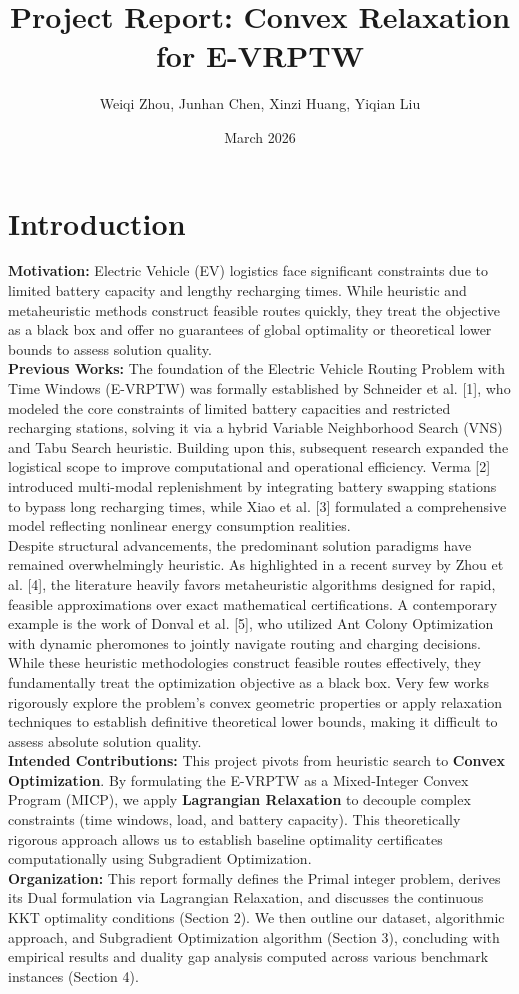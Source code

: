 \documentclass[11pt]{article}
\title{\textbf{Project Report: Convex Relaxation for E-VRPTW}}
\author{Weiqi Zhou, Junhan Chen, Xinzi Huang, Yiqian Liu}
\date{March 2026}
\begin{document}
\maketitle

\section{Introduction}
\textbf{Motivation:} Electric Vehicle (EV) logistics face significant constraints due to limited battery capacity and lengthy recharging times. While heuristic and metaheuristic methods construct feasible routes quickly, they treat the objective as a black box and offer no guarantees of global optimality or theoretical lower bounds to assess solution quality. \\
\textbf{Previous Works:} The foundation of the Electric Vehicle Routing Problem with Time Windows (E-VRPTW) was formally established by Schneider et al. [1], who modeled the core constraints of limited battery capacities and restricted recharging stations, solving it via a hybrid Variable Neighborhood Search (VNS) and Tabu Search heuristic. Building upon this, subsequent research expanded the logistical scope to improve computational and operational efficiency. Verma [2] introduced multi-modal replenishment by integrating battery swapping stations to bypass long recharging times, while Xiao et al. [3] formulated a comprehensive model reflecting nonlinear energy consumption realities.\\

Despite structural advancements, the predominant solution paradigms have remained overwhelmingly heuristic. As highlighted in a recent survey by Zhou et al. [4], the literature heavily favors metaheuristic algorithms designed for rapid, feasible approximations over exact mathematical certifications. A contemporary example is the work of Donval et al. [5], who utilized Ant Colony Optimization with dynamic pheromones to jointly navigate routing and charging decisions. While these heuristic methodologies construct feasible routes effectively, they fundamentally treat the optimization objective as a black box. Very few works rigorously explore the problem's convex geometric properties or apply relaxation techniques to establish definitive theoretical lower bounds, making it difficult to assess absolute solution quality.\\
\textbf{Intended Contributions:} This project pivots from heuristic search to \textbf{Convex Optimization}. By formulating the E-VRPTW as a Mixed-Integer Convex Program (MICP), we apply \textbf{Lagrangian Relaxation} to decouple complex constraints (time windows, load, and battery capacity). This theoretically rigorous approach allows us to establish baseline optimality certificates computationally using Subgradient Optimization.\\
\textbf{Organization:} This report formally defines the Primal integer problem, derives its Dual formulation via Lagrangian Relaxation, and discusses the continuous KKT optimality conditions (Section 2). We then outline our dataset, algorithmic approach, and Subgradient Optimization algorithm (Section 3), concluding with empirical results and duality gap analysis computed across various benchmark instances (Section 4).
\end{document}

